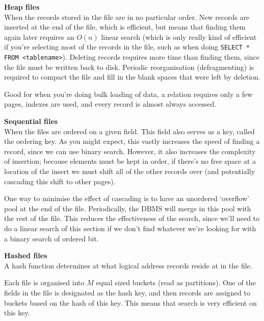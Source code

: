 \begin{description}
  \item \textbf{Heap files}\\
    When the records stored in the file are in no particular order. New records
    are inserted at the end of the file, which is efficient, but means that
    finding them again later requires an $O(n)$ linear search (which is only
    really kind of efficient if you're selecting most of the records in the
    file, such as when doing \texttt{SELECT * FROM <tablename>}). Deleting
    records requires more time than finding them, since the file must be written
    back to disk. Periodic reorganisation (defragmenting) is required to compact
    the file and fill in the blank spaces that were left by deletion.

    Good for when you're doing bulk loading of data, a relation requires only a
    few pages, indexes are used, and every record is almost always accessed.

  \item \textbf{Sequential files}\\

    When the files are ordered on a given field. This field also serves as a
    key, called the ordering key. As you might expect, this vastly increases the
    speed of finding a record, since we can use binary search. However, it also
    increases the complexity of insertion; because elements must be kept in
    order, if there's no free space at a location of the insert we must shift
    all of the other records over (and potentially cascading this shift to other
    pages).


    One way to minimise the effect of cascading is to have an unordered
    `overflow' pool at the end of the file. Periodically, the DBMS will merge in
    this pool with the rest of the file. This reduces the effectiveness of the
    search, since we'll need to do a linear search of this section if we don't
    find whatever we're looking for with a binary search of ordered bit.

  \item \textbf{Hashed files}\\

    A hash function determines at what logical address records reside at in the
    file.

    Each file is organised into $M$ equal sized buckets (read as partitions).
    One of the fields in the file is designated as the hash key, and then
    records are assigned to buckets based on the hash of this key. This means
    that search is very efficient on this key.


\end{description}
